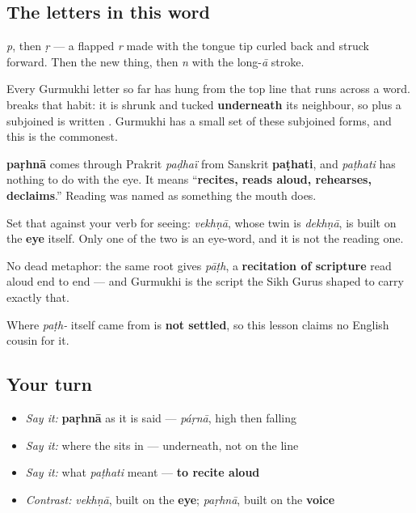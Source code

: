 \subsection*{The letters in this word}
\textbf{} \emph{p}, then \textbf{} \emph{ṛ} — a flapped \emph{r} made with the tongue tip curled back and struck forward. Then the new thing, then \textbf{} \emph{n} with the long-\emph{ā} stroke.

Every Gurmukhi letter so far has hung from the top line that runs across a word. \textbf{} breaks that habit: it is \textbf{} shrunk and tucked \textbf{underneath} its neighbour, so \textbf{} plus a subjoined \textbf{} is written \textbf{}. Gurmukhi has a small set of these subjoined forms, and this is the commonest.

\begin{cousinweb}
\textbf{paṛhnā} comes through Prakrit \emph{paḍhaï} from Sanskrit \textbf{paṭhati}, and \emph{paṭhati} has nothing to do with the eye. It means “\textbf{recites, reads aloud, rehearses, declaims}.” Reading was named as something the mouth does.

Set that against your verb for seeing: \textbf{} \emph{vekhṇā}, whose twin is \emph{dekhṇā}, is built on the \textbf{eye} itself. Only one of the two is an eye-word, and it is not the reading one.

No dead metaphor: the same root gives \textbf{} \emph{pāṭh}, a \textbf{recitation of scripture} read aloud end to end — and Gurmukhi is the script the Sikh Gurus shaped to carry exactly that.

Where \emph{paṭh-} itself came from is \textbf{not settled}, so this lesson claims no English cousin for it.
\end{cousinweb}

\subsection*{Your turn}
\begin{itemize}
\raggedright
  \item \emph{Say it:} \textbf{paṛhnā} as it is said — \emph{páṛnā}, high then falling
  \item \emph{Say it:} where the \textbf{} sits in \textbf{} — underneath, not on the line
  \item \emph{Say it:} what \emph{paṭhati} meant — \textbf{to recite aloud}
  \item \emph{Contrast:} \emph{vekhṇā}, built on the \textbf{eye}; \emph{paṛhnā}, built on the \textbf{voice}
\end{itemize}

